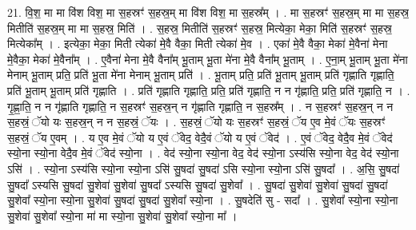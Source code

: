 \documentclass[17pt]{extarticle}
\begin{document}
21. वि॒श॒ मा मा वि॑श विश॒ मा स॒हस्रꣳ॑ स॒हस्र॒म् मा वि॑श विश॒ मा स॒हस्र᳚म् । . मा स॒हस्रꣳ॑ स॒हस्र॒म् मा मा स॒हस्र॒ मितीति॑ स॒हस्र॒म् मा मा स॒हस्र॒ मिति॑ । . स॒हस्र॒ मितीति॑ स॒हस्रꣳ॑ स॒हस्र॒ मित्येका॒ मेका॒ मिति॑ स॒हस्रꣳ॑ स॒हस्र॒ मित्येका᳚म् । . इत्येका॒ मेका॒ मिती त्येका॑ मे॒वै वैका॒ मिती त्येका॑ मे॒व । . एका॑ मे॒वै वैका॒ मेका॑ मे॒वैना॑ मेना मे॒वैका॒ मेका॑ मे॒वैना᳚म् । . ए॒वैना॑ मेना मे॒वै वैना᳚म् भू॒ताम् भू॒ता मे॑ना मे॒वै वैना᳚म् भू॒ताम् । . ए॒ना॒म् भू॒ताम् भू॒ता मे॑ना मेनाम् भू॒ताम् प्रति॒ प्रति॑ भू॒ता मे॑ना मेनाम् भू॒ताम् प्रति॑ । . भू॒ताम् प्रति॒ प्रति॑ भू॒ताम् भू॒ताम् प्रति॑ गृह्णाति गृह्णाति॒ प्रति॑ भू॒ताम् भू॒ताम् प्रति॑ गृह्णाति । . प्रति॑ गृह्णाति गृह्णाति॒ प्रति॒ प्रति॑ गृह्णाति॒ न न गृ॑ह्णाति॒ प्रति॒ प्रति॑ गृह्णाति॒ न । . गृ॒ह्णा॒ति॒ न न गृ॑ह्णाति गृह्णाति॒ न स॒हस्रꣳ॑ स॒हस्र॒न् न गृ॑ह्णाति गृह्णाति॒ न स॒हस्र᳚म् । . न स॒हस्रꣳ॑ स॒हस्र॒न् न न स॒हस्रं॒ ॅयो यः स॒हस्र॒न् न न स॒हस्रं॒ ॅयः । . स॒हस्रं॒ ॅयो यः स॒हस्रꣳ॑ स॒हस्रं॒ ॅय ए॒व मे॒वं ॅयः स॒हस्रꣳ॑ स॒हस्रं॒ ॅय ए॒वम् । . य ए॒व मे॒वं ॅयो य ए॒वं ॅवेद॒ वेदै॒वं ॅयो य ए॒वं ॅवेद॑ । . ए॒वं ॅवेद॒ वेदै॒व मे॒वं ॅवेद॑ स्यो॒ना स्यो॒ना वेदै॒व मे॒वं ॅवेद॑ स्यो॒ना । . वेद॑ स्यो॒ना स्यो॒ना वेद॒ वेद॑ स्यो॒ना ऽस्य॑सि स्यो॒ना वेद॒ वेद॑ स्यो॒ना ऽसि॑ । . स्यो॒ना ऽस्य॑सि स्यो॒ना स्यो॒ना ऽसि॑ सु॒षदा॑ सु॒षदा॑ ऽसि स्यो॒ना स्यो॒ना ऽसि॑ सु॒षदा᳚ । . अ॒सि॒ सु॒षदा॑ सु॒षदा᳚ ऽस्यसि सु॒षदा॑ सु॒शेवा॑ सु॒शेवा॑ सु॒षदा᳚ ऽस्यसि सु॒षदा॑ सु॒शेवा᳚ । . सु॒षदा॑ सु॒शेवा॑ सु॒शेवा॑ सु॒षदा॑ सु॒षदा॑ सु॒शेवा᳚ स्यो॒ना स्यो॒ना सु॒शेवा॑ सु॒षदा॑ सु॒षदा॑ सु॒शेवा᳚ स्यो॒ना । . सु॒षदेति॑ सु - सदा᳚ । . सु॒शेवा᳚ स्यो॒ना स्यो॒ना सु॒शेवा॑ सु॒शेवा᳚ स्यो॒ना मा॑ मा स्यो॒ना सु॒शेवा॑ सु॒शेवा᳚ स्यो॒ना मा᳚ । \newline
\end{document}
